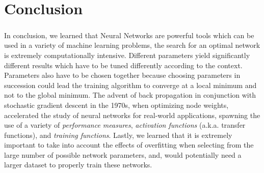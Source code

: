 \documentclass[a4paper,12pt,oneside,final]{report}
\begin{document}
\chapter{Conclusion}
\paragraph{}
In conclusion, we learned that Neural Networks are powerful tools which can be used in a variety of machine learning problems, the search for an optimal network is extremely computationally intensive.  Different parameters yield significantly different results which have to be tuned differently according to the context. Parameters also have to be chosen together because choosing parameters in succession could lead the training algorithm to converge at a local minimum and not to the global minimum. The advent of back propagation in conjunction with stochastic gradient descent in the 1970s, when optimizing node weights, accelerated the study of neural networks for real-world applications, spawning the use of a variety of \emph{performance measures}, \emph{activation functions} (a.k.a. transfer functions), and \emph{training functions}.  Lastly, we learned that it is extremely important to take into account the effects of overfitting when selecting from the large number of possible network parameters, and, would potentially need a larger dataset to properly train these networks.




\begin{appendices}

\end{appendices}
\end{document}
